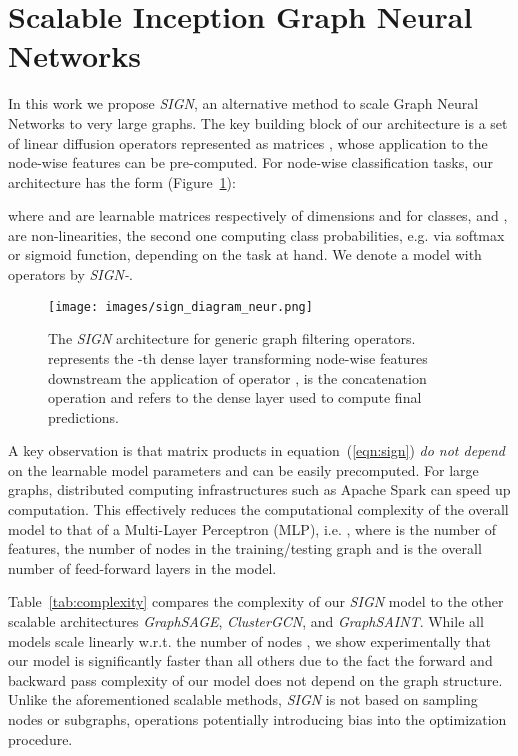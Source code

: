 \documentclass{article}
\begin{document}
\section{Scalable Inception Graph Neural Networks}\label{s:method}

In this work we propose \textit{SIGN}, an alternative method to scale Graph Neural Networks to very large graphs.
The key building block of our architecture is a set of linear diffusion operators represented as  matrices , whose application to the node-wise features can be pre-computed.  
For node-wise classification tasks, our architecture has the form (Figure~\ref{fig:sign-architecture}):

\noindent where  and   are learnable matrices respectively of dimensions  and  for  classes, and ,  are non-linearities, the second one computing class probabilities, e.g. via softmax or sigmoid function, depending on the task at hand. We denote a model with  operators by {\em SIGN-}. 

\begin{figure}\centering
    \texttt{[image: images/sign\_diagram\_neur.png]}
    \caption{The \textit{SIGN} architecture for  generic graph filtering operators.  represents the -th dense layer transforming node-wise features downstream the application of operator ,  is the concatenation operation and  refers to the dense layer used to compute final predictions.}
    \label{fig:sign-architecture}
\end{figure}

A key observation is that matrix products  in equation~(\ref{eqn:sign}) {\em do not depend} on the learnable model parameters and can be easily precomputed. For large graphs, distributed computing infrastructures such as Apache Spark can speed up computation. This effectively reduces the computational complexity of the overall model to that of a Multi-Layer Perceptron (MLP), i.e. , where  is the number of features,  the number of nodes in the training/testing graph and  is the overall number of feed-forward layers in the model. 

Table~\ref{tab:complexity} compares the complexity of our \textit{SIGN} model to the other scalable architectures \textit{GraphSAGE}, \textit{ClusterGCN}, and \textit{GraphSAINT}. While all models scale linearly w.r.t. the number of nodes , we show experimentally that our model is significantly faster than all others due to the fact the forward and backward pass complexity of our model does not depend on the graph structure.
Unlike the aforementioned scalable methods, \textit{SIGN} is not based on sampling nodes or subgraphs, operations potentially introducing bias into the optimization procedure. 
\end{document}
